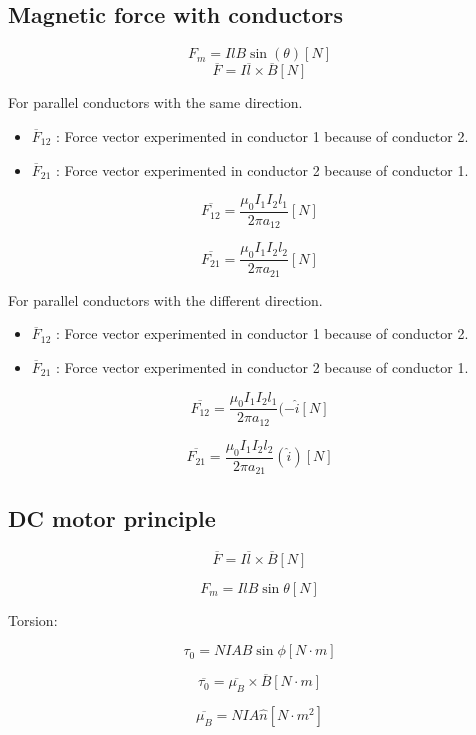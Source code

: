 \documentclass[letterpaper]{article}
\newcommand{\divline}{\noindent\makebox[\linewidth]{\rule{\textwidth}{0.4pt}}}
\begin{document}
    \begin{multicols}{2}
        \section{Magnetic force with conductors}

        \[F_m = I l B \sin{(\theta)} [N]\]
        \[\overline{F} = I \overline{l} \times \overline{B} [N]\]

        For parallel conductors with the same direction.

        \begin{itemize}
            \item \(\overline{F}_{12}\) : Force vector experimented in conductor 1 because of conductor 2.
            \item \(\overline{F}_{21}\) : Force vector experimented in conductor 2 because of conductor 1.
        \end{itemize}

        \[\overline{F_{12}} = \frac{\mu_0 I_1 I_2 l_1}{2 \pi a_{12}} [N]\]

        \[\overline{F_{21}} = \frac{\mu_0 I_1 I_2 l_2}{2 \pi a_{21}} [N]\]

        For parallel conductors with the different direction.

        \begin{itemize}
            \item \(\overline{F}_{12}\) : Force vector experimented in conductor 1 because of conductor 2.
            \item \(\overline{F}_{21}\) : Force vector experimented in conductor 2 because of conductor 1.
        \end{itemize}

        \[\overline{F_{12}} = \frac{\mu_0 I_1 I_2 l_1}{2 \pi a_{12}} (- \hat{i} [N]\]

        \[\overline{F_{21}} = \frac{\mu_0 I_1 I_2 l_2}{2 \pi a_{21}} (\hat{i})[N]\]
        
    \end{multicols}
    \divline

    \begin{multicols}{3}
        \section{DC motor principle}

        \[\overline{F} = I \overline{l} \times \overline{B} [N]\]

        \[F_m = I l B \sin{\theta} [N]\]

        Torsion:

        \[\tau_0 = N I A B \sin{\phi} [N \cdot m]\]

        \[\overline{\tau_0} = \overline{\mu_B} \times \overline{B} [N \cdot m] \]

        \[\overline{\mu_B} = N I A \hat{n} [N \cdot m^2]\]
        
    \end{multicols}
    \divline
\end{document}

